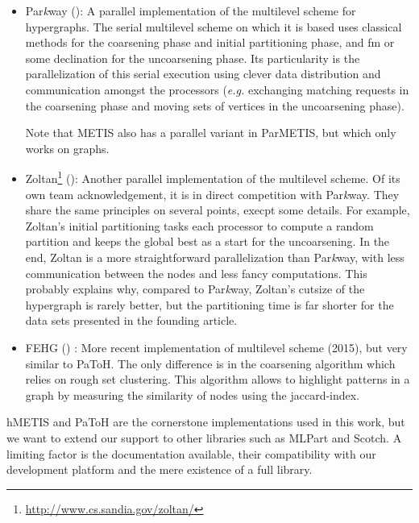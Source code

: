 \documentclass[11pt,a4paper]{report} %
\theoremstyle{customdef}
\begin{document}
\begin{itemize}
	\item Par\textit{k}way (\citet{Trifunovic2004}): A parallel implementation of the multilevel scheme for hypergraphs.
	The serial multilevel scheme on which it is based uses classical methods for the coarsening phase and initial partitioning phase, and \gls{fm} or some declination for the uncoarsening phase.
	Its particularity is the parallelization of this serial execution using clever data distribution and communication amongst the processors (\textit{e.g.} exchanging matching requests in the coarsening phase and moving sets of vertices in the uncoarsening phase).

	Note that METIS also has a parallel variant in ParMETIS, but which only works on graphs.
	
	\item Zoltan\footnote{\url{http://www.cs.sandia.gov/zoltan/}} (\citet{Devine2006}): Another parallel implementation of the multilevel scheme.
	Of its own team acknowledgement, it is in direct competition with Par\textit{k}way.
	They share the same principles on several points, execpt some details.
	For example, Zoltan's initial partitioning tasks each processor to compute a random partition and keeps the global best as a start for the uncoarsening.
	In the end, Zoltan is a more straightforward parallelization than Par\textit{k}way, with less communication between the nodes and less fancy computations.
	This probably explains why, compared to Par\textit{k}way, Zoltan's cutsize of the hypergraph is rarely better, but the partitioning time is far shorter for the data sets presented in the founding article.
	\item FEHG (\citet{Lotfifar2015}) : More recent implementation of multilevel scheme (2015), but very similar to PaToH.
	The only difference is in the coarsening algorithm which relies on rough set clustering.
	This algorithm allows to highlight patterns in a graph by measuring the similarity of nodes using the \gls{jaccard-index}.
\end{itemize}

hMETIS and PaToH are the cornerstone implementations used in this work, but we want to extend our support to other libraries such as MLPart and Scotch.
A limiting factor is the documentation available, their compatibility with our development platform and the mere existence of a full library.
\end{document}
